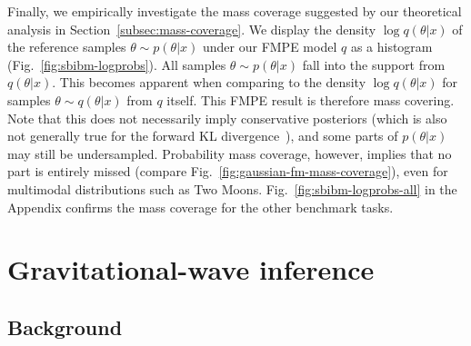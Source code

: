 \documentclass{article}
\theoremstyle{remark}
\begin{document}
Finally, we empirically investigate the mass coverage suggested by our theoretical analysis in Section~\ref{subsec:mass-coverage}. We display the density $\log q(\theta|x)$ of the reference samples $\theta\sim p(\theta|x)$ under our FMPE model $q$ as a histogram (Fig.~\ref{fig:sbibm-logprobs}). All samples $\theta\sim p(\theta|x)$ fall into the support from $q(\theta|x)$. This becomes apparent when comparing to the density $\log q(\theta|x)$ for samples $\theta\sim q(\theta|x)$ from $q$ itself. This FMPE result is therefore mass covering. Note that this does not necessarily imply conservative posteriors (which is also not generally true for the forward KL divergence~\cite{hermans2021averting,delaunoy2022reliable,delaunoy2023balancing}), and some parts of $p(\theta|x)$ may still be undersampled. Probability mass coverage, however, implies that no part is entirely missed (compare Fig.~\ref{fig:gaussian-fm-mass-coverage}), even for multimodal distributions such as Two Moons. Fig.~\ref{fig:sbibm-logprobs-all} in the Appendix confirms the mass coverage for the other benchmark tasks.

\section{Gravitational-wave inference}
\label{sec:gw}

\subsection{Background}
\end{document}
